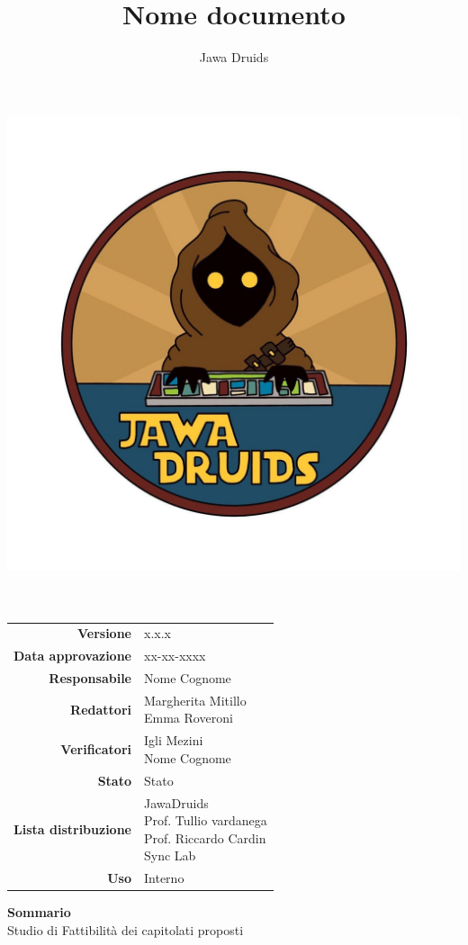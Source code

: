 



	
	\makeatletter
	\begin{titlepage}
		\begin{center}
			\vspace*{-5cm}
			\author{Jawa Druids} 
			\title{Nome documento}
			\date{} %
			\includegraphics[width=0.5\linewidth]{../immagini/DRUIDSLOGO.jpg}\\[4ex]
			{\huge \bfseries  \@title }\\[2ex] 
			{\LARGE  \@author}\\[50ex]
			\vspace*{-9cm}
			\begin{table}[H]
				\renewcommand{\arraystretch}{1.4}
				\centering
				\begin{tabular}{r | l}
					\textbf{Versione} & x.x.x \\%
					\textbf{Data approvazione} & xx-xx-xxxx\\
					\textbf{Responsabile} & Nome Cognome\\
					\textbf{Redattori} & \makecell[tl]{Margherita Mitillo \\ Emma Roveroni} \\
					\textbf{Verificatori} & \makecell[tl]{Igli Mezini \\ Nome Cognome} \\
					\textbf{Stato} & Stato\\
					\textbf{Lista distribuzione} & \makecell[tl]{JawaDruids \\ Prof. Tullio vardanega \\ Prof. Riccardo Cardin \\ Sync Lab}\\
					\textbf{Uso} & Interno
				\end{tabular}
			\end{table}
			\vspace{0.1cm}
			\hfill \break
			\fontsize{17}{10}\textbf{Sommario} \\
			\vspace{0.1cm}
			Studio di Fattibilità dei capitolati proposti 
		\end{center}
	\end{titlepage}
	\makeatother
	
